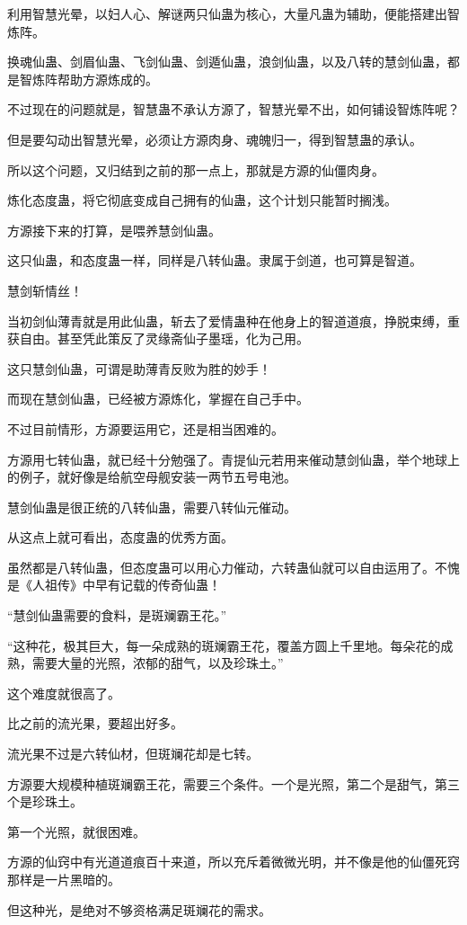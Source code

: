 \begin{this_body}
利用智慧光晕，以妇人心、解谜两只仙蛊为核心，大量凡蛊为辅助，便能搭建出智炼阵。

换魂仙蛊、剑眉仙蛊、飞剑仙蛊、剑遁仙蛊，浪剑仙蛊，以及八转的慧剑仙蛊，都是智炼阵帮助方源炼成的。

不过现在的问题就是，智慧蛊不承认方源了，智慧光晕不出，如何铺设智炼阵呢？

但是要勾动出智慧光晕，必须让方源肉身、魂魄归一，得到智慧蛊的承认。

所以这个问题，又归结到之前的那一点上，那就是方源的仙僵肉身。

炼化态度蛊，将它彻底变成自己拥有的仙蛊，这个计划只能暂时搁浅。

方源接下来的打算，是喂养慧剑仙蛊。

这只仙蛊，和态度蛊一样，同样是八转仙蛊。隶属于剑道，也可算是智道。

慧剑斩情丝！

当初剑仙薄青就是用此仙蛊，斩去了爱情蛊种在他身上的智道道痕，挣脱束缚，重获自由。甚至凭此策反了灵缘斋仙子墨瑶，化为己用。

这只慧剑仙蛊，可谓是助薄青反败为胜的妙手！

而现在慧剑仙蛊，已经被方源炼化，掌握在自己手中。

不过目前情形，方源要运用它，还是相当困难的。

方源用七转仙蛊，就已经十分勉强了。青提仙元若用来催动慧剑仙蛊，举个地球上的例子，就好像是给航空母舰安装一两节五号电池。

慧剑仙蛊是很正统的八转仙蛊，需要八转仙元催动。

从这点上就可看出，态度蛊的优秀方面。

虽然都是八转仙蛊，但态度蛊可以用心力催动，六转蛊仙就可以自由运用了。不愧是《人祖传》中早有记载的传奇仙蛊！

“慧剑仙蛊需要的食料，是斑斓霸王花。”

“这种花，极其巨大，每一朵成熟的斑斓霸王花，覆盖方圆上千里地。每朵花的成熟，需要大量的光照，浓郁的甜气，以及珍珠土。”

这个难度就很高了。

比之前的流光果，要超出好多。

流光果不过是六转仙材，但斑斓花却是七转。

方源要大规模种植斑斓霸王花，需要三个条件。一个是光照，第二个是甜气，第三个是珍珠土。

第一个光照，就很困难。

方源的仙窍中有光道道痕百十来道，所以充斥着微微光明，并不像是他的仙僵死窍那样是一片黑暗的。

但这种光，是绝对不够资格满足斑斓花的需求。


\end{this_body}
